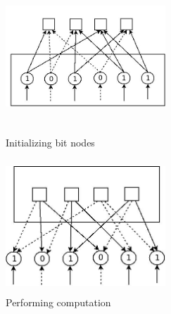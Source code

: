\begin{figure}[h]
  \centering
  \begin{minipage}[b]{0.45\textwidth}
    \includegraphics[height=5cm,width=6cm]{initialization}
    \caption[Initializing code bits to bit nodes ]{Initializing bit nodes}
    \label{initialization}
  \end{minipage}
  \hspace{4mm}
  \begin{minipage}[b]{0.45\textwidth}
    \includegraphics[height=5cm,width=6cm]{PerCheck}
    \caption[Performing computation on check nodes] {Performing computation}
    \label{PerCheck}
  \end{minipage}
\end{figure}    

